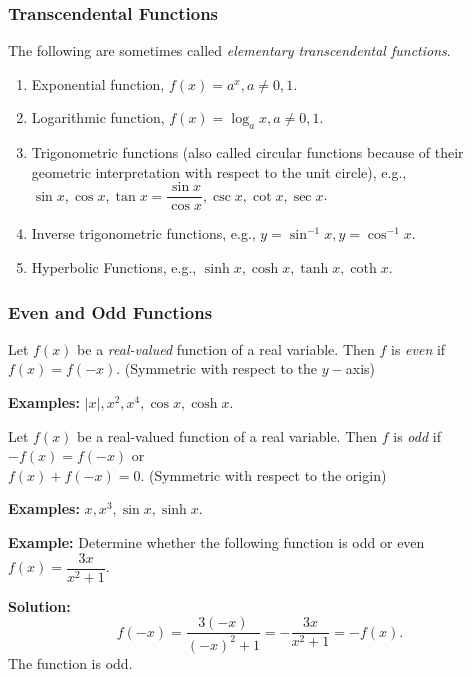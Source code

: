 \documentclass[titlepage,a4paper,12pt]{report}
\begin{document}
 \subsubsection*{Transcendental  Functions}
 The following are sometimes called \textit{elementary transcendental functions}.
 \begin{enumerate}
 \item  Exponential function, $f(x)=a^x, a\neq 0,1$.
 \item Logarithmic  function, $f(x)=\log _a x, a\neq 0,1$.
 \item Trigonometric functions (also called circular functions because of their geometric interpretation with respect to the unit circle), e.g., $\sin x, \cos x, \tan x =\dfrac{\sin x}{\cos x}, \csc x, \cot x, \sec x$.
 \item Inverse trigonometric functions, e.g., $y=\sin ^{-1} x, y=\cos ^{-1} x$.
 \item Hyperbolic Functions, e.g., $\sinh x, \cosh x, \tanh x, \coth x$.
  \end{enumerate}
  \subsubsection{Even and Odd Functions}
  Let $f(x)$ be a \textit{real-valued} function of a real variable. Then $f$ is \textit{even} if $f(x)=f(-x)$. (Symmetric with respect to the $y-$axis)
  
\noindent \textbf{Examples:} $|x|, x^2, x^4, \cos x, \cosh x$.

\noindent Let $f(x)$ be a real-valued function of a real variable. Then $f$ is \textit{odd} if $-f(x)=f(-x)$ or \\$f(x)+f(-x)=0$. (Symmetric with respect to the origin)

\noindent \textbf{Examples:} $x, x^3, \sin x, \sinh x$.

\noindent \textbf{Example:} Determine whether the following function is odd or even $f(x)=\dfrac{3x}{x^2+1}$.

\noindent \textbf{Solution:} \begin{equation*}
f(-x)=\dfrac{3(-x)}{(-x)^2+1}=-\dfrac{3x}{x^2+1}=-f(x).
\end{equation*}
The function is odd.
\end{document}
